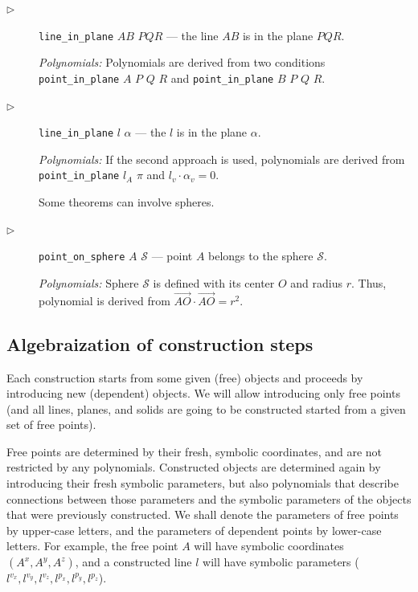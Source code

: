 \documentclass[final,1p,times,authoryear]{elsarticle}
\begin{document}
\begin{description}
\item[$\triangleright$] {\tt line\_in\_plane} $AB$ $PQR$ --- the line
  $AB$ is in the plane $PQR$.

  {\em Polynomials:} Polynomials are derived from two conditions {\tt
    point\_in\_plane} $A$ $P$ $Q$ $R$ and {\tt point\_in\_plane} $B$
  $P$ $Q$ $R$.

\item[$\triangleright$] {\tt line\_in\_plane} $l$ $\alpha$ --- the $l$
  is in the plane $\alpha$.

  {\em Polynomials:} If the second approach is used, polynomials are
  derived from {\tt point\_in\_plane} $l_A$ $\pi$ and
  $l_v \cdot \alpha_v = 0$.

\bigskip
Some theorems can involve spheres. 

\item[$\triangleright$] {\tt point\_on\_sphere} $A$ $\mathcal{S}$
  --- point $A$ belongs to the sphere $\mathcal{S}$.

{\em Polynomials:} Sphere $\mathcal{S}$ is defined with its center $O$
and radius $r$. Thus, polynomial is derived from
$\overrightarrow{AO}\cdot\overrightarrow{AO} = r^2$.

\end{description}


\subsection{Algebraization of construction steps}
Each construction starts from some given (free) objects and proceeds
by introducing new (dependent) objects. We will allow introducing only
free points (and all lines, planes, and solids are going to be
constructed started from a given set of free points).

Free points are determined by their fresh, symbolic coordinates, and
are not restricted by any polynomials. Constructed objects are
determined again by introducing their fresh symbolic parameters, but
also polynomials that describe connections between those parameters
and the symbolic parameters of the objects that were previously
constructed. We shall denote the parameters of free points by
upper-case letters, and the parameters of dependent points by
lower-case letters. For example, the free point $A$ will have symbolic
coordinates $({A}^x, {A}^y, {A}^z)$, and a constructed line $l$ will
have symbolic parameters (${l}^{v_x}, {l}^{v_y}, {l}^{v_z}, {l}^{p_x},
{l}^{p_y}, {l}^{p_z}$).
\end{document}
